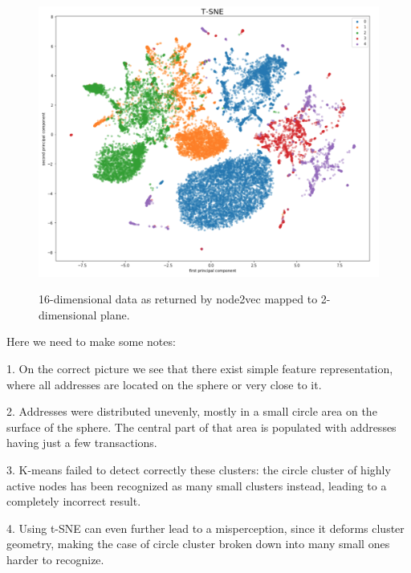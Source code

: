 

\begin{figure}[H]\centering
  \includegraphics[width=0.8\linewidth]{plots/t-SNE.png}\\
  \caption{16-dimensional data as returned by node2vec mapped to 2-dimensional plane. }
\end{figure}

Here we need to make some notes:

1. On the correct picture we see that there exist simple feature representation, where all addresses are located on the sphere or very close to it. 

2. Addresses were distributed unevenly, mostly in a small circle area on the surface of the sphere. The central part of that area is populated with addresses having just a few transactions. 

3. K-means failed to detect correctly these clusters: the circle cluster of highly active nodes has been recognized as many small clusters instead, leading to a completely incorrect result.

4. Using t-SNE can even further lead to a misperception, since it deforms cluster geometry, making the case of circle cluster broken down into many small ones harder to recognize.

